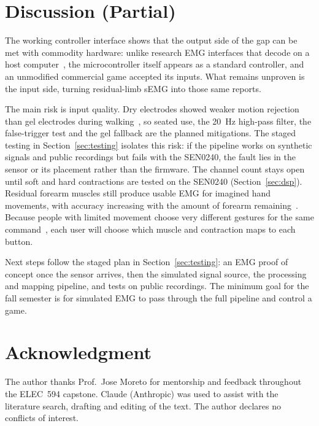 \documentclass[conference]{IEEEtran}
\begin{document}
\section{Discussion (Partial)}

The working controller interface shows that the output side of the gap can be met with commodity hardware: unlike research EMG interfaces that decode on a host computer~\cite{myogestic}, the microcontroller itself appears as a standard controller, and an unmodified commercial game accepted its inputs. What remains unproven is the input side, turning residual-limb sEMG into those same reports.

The main risk is input quality. Dry electrodes showed weaker motion rejection than gel electrodes during walking~\cite{li2020}, so seated use, the 20~Hz high-pass filter, the false-trigger test and the gel fallback are the planned mitigations. The staged testing in Section~\ref{sec:testing} isolates this risk: if the pipeline works on synthetic signals and public recordings but fails with the SEN0240, the fault lies in the sensor or its placement rather than the firmware. The channel count stays open until soft and hard contractions are tested on the SEN0240 (Section~\ref{sec:dsp}). Residual forearm muscles still produce usable EMG for imagined hand movements, with accuracy increasing with the amount of forearm remaining~\cite{atzori}. Because people with limited movement choose very different gestures for the same command~\cite{yamagami2023}, each user will choose which muscle and contraction maps to each button.

Next steps follow the staged plan in Section~\ref{sec:testing}: an EMG proof of concept once the sensor arrives, then the simulated signal source, the processing and mapping pipeline, and tests on public recordings. The minimum goal for the fall semester is for simulated EMG to pass through the full pipeline and control a game.

\section*{Acknowledgment}

The author thanks Prof.~Jose Moreto for mentorship and feedback throughout the ELEC~594 capstone. Claude (Anthropic) was used to assist with the literature search, drafting and editing of the text. The author declares no conflicts of interest.
\end{document}
